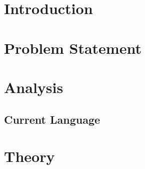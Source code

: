


\frontmatter %
\newcommand{\ind}[1]{}

\ind{FormaliaForside}
\cleardoublepage %

\ind{FormaliaTitelblad}
\cleardoublepage
\ind{FormaliaProlog.tex}
\ind{FormaliaUnderskriftsside.tex}
\cleardoublepage



\setlength\parskip{0ex} %
\tableofcontents* %
\setlength{\parskip}{3mm} %



\label{marker}
\mainmatter

\pagestyle{custom}

\chapter{Introduction}
\ind{FormaliaIndledning}

\renewcommand{\ind}[1]{}
\chapter{Problem Statement}
\chapter{Analysis}
	\ind{ourEnvironment}
	\section{Current Language}
	\ind{Hardware}
	\ind{problemstatement}

\renewcommand{\ind}[1]{}
\chapter{Theory}
	\ind{OverviewCompiler}

